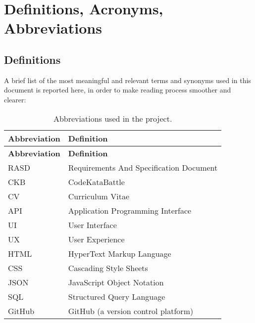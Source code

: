 \section{Definitions, Acronyms, Abbreviations}

\subsection{Definitions}

A brief list of the most meaningful and relevant terms and synonyms used in this document is reported
here, in order to make reading process smoother and clearer:

\begin{longtable}{l p{15cm}}
\caption{Abbreviations used in the project.} \label{tab:abbreviations} \\
\hline
\textbf{Abbreviation} & \textbf{Definition} \\
\hline
\endfirsthead

\hline
\textbf{Abbreviation} & \textbf{Definition} \\
\hline
\endhead

\hline
\endfoot

\hline
RASD & Requirements And Specification Document \\
CKB & CodeKataBattle \\
CV & Curriculum Vitae \\
API & Application Programming Interface \\
UI & User Interface \\
UX & User Experience \\
HTML & HyperText Markup Language \\
CSS & Cascading Style Sheets \\
JSON & JavaScript Object Notation \\
SQL & Structured Query Language \\
GitHub & GitHub (a version control platform) \\
\end{longtable}


